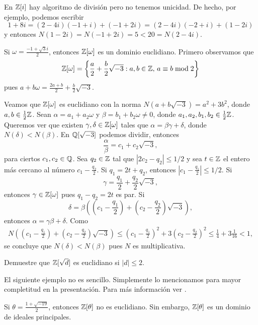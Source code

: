 En $\mathbb{Z}[i]$ hay algoritmo de división pero no tenemos unicidad. De hecho, 
por ejemplo, podemos escribir 
\[
1+8i=(2-4i)(-1+i)+(-1+2i)
=(2-4i)(-2+i)+(1-2i)
\] 
y entonces
$N(1-2i)=N(-1+2i)=5<20=N(2-4i)$.

\begin{example}
Si $\omega=\frac{-1+\sqrt{3}i}{2}$, entonces $\mathbb{Z}[\omega]$ es un dominio euclidiano.	Primero observamos que
\[
\mathbb{Z}[\omega]=\left\{\frac{a}{2}+\frac{b}{2}\sqrt{-3}:a,b\in\mathbb{Z},\,a\equiv b\bmod 2\right\}
\]
pues $a+b\omega=\frac{2a+b}{2}+\frac{b}{2}\sqrt{-3}$. 

Veamos que $\mathbb{Z}[\omega]$ es euclidiano con la norma  
$N(a+b\sqrt{-3})=a^2+3b^2$, donde $a,b\in\frac{1}{2}\mathbb{Z}$. Sean $\alpha=a_1+a_2\omega$ y $\beta=b_1+b_2\omega\ne 0$, donde
$a_1,a_2,b_1,b_2\in\frac{1}{2}\mathbb{Z}$. Queremos ver que existen $\gamma,\delta\in\mathbb{Z}[\omega]$ tales que $\alpha=\beta\gamma+\delta$, donde $N(\delta)<N(\beta)$. 
En $\mathbb{Q}[\sqrt{-3}]$ podemos dividir, entonces 
\[
\frac{\alpha}{\beta}=c_1+c_2\sqrt{-3},
\]
para ciertos $c_1,c_2\in\mathbb{Q}$. Sea $q_2\in\mathbb{Z}$ tal que $|2c_2-q_2|\leq 1/2$ y sea $t\in\mathbb{Z}$ el entero más cercano al número $c_1-\frac{q_2}{2}$. 
Si $q_1=2t+q_2$, entonces $|c_1-\frac{q_1}{2}|\leq 1/2$. Si 
\[
\gamma=\frac{q_1}{2}+\frac{q_2}{2}\sqrt{-3},
\]
entonces $\gamma\in\mathbb{Z}[\omega]$ pues $q_1-q_2=2t$ es par. Si 
\[
\delta=\beta\left( (c_1-\frac{q_1}{2})+(c_2-\frac{q_2}{2})\sqrt{-3}\right),
\]
entonces $\alpha=\gamma\beta+\delta$. 
Como  
\begin{multline*}
N\left( (c_1-\frac{q_1}{2})+(c_2-\frac{q_2}{2})\sqrt{-3}\right)
\leq ( c_1-\frac{q_1}{2})^2+3(c_2-\frac{q_2}{2})^2\leq \frac{1}{4}+3\frac{1}{16}<1, 
\end{multline*}
se concluye que $N(\delta)<N(\beta)$ pues $N$ es multiplicativa. 
\end{example}

\begin{exercise}
Demuestre que $\mathbb{Z}[\sqrt{d}]$ es euclidiano si $|d|\leq 2$.
\end{exercise}

El siguiente ejemplo no es sencillo. Simplemente lo mencionamos para mayor completitud en la presentación.  Para más información ver \cite{MR967349,MR3665445,MR314831}.

\begin{example}
Si $\theta=\frac{1+\sqrt{-19}}{2}$, entonces $\mathbb{Z}[\theta]$ no es euclidiano.	Sin embargo, $\mathbb{Z}[\theta]$ es 
un dominio de ideales principales. 
\end{example}

